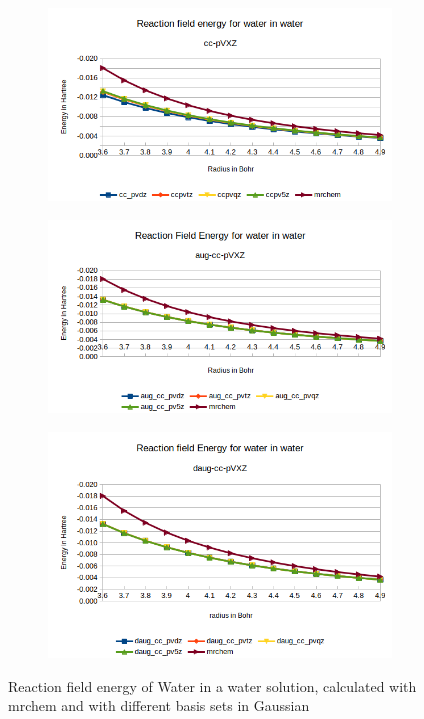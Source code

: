 \documentclass[../master_thesis.tex]{subfiles}
\begin{document}
\begin{figure}[h!]
  \centering
  \begin{subfigure}[b]{0.75\linewidth}
    \includegraphics[width=\linewidth]{img/Erwat.png}
  \end{subfigure}
  \begin{subfigure}[b]{0.75\linewidth}
    \includegraphics[width=\linewidth]{img/Eraugwat.png}
  \end{subfigure}
  \begin{subfigure}[b]{0.75\linewidth}
    \includegraphics[width=\linewidth]{img/Erdaugwat.png}
  \end{subfigure}
  \caption{Reaction field energy of Water in a water solution, calculated with mrchem
  and with different basis sets in Gaussian}
  \label{fig:watEnergyplots}
\end{figure}
\end{document}
